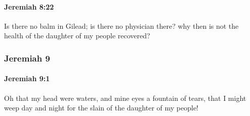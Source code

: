 		\paragraph{Jeremiah 8:22} %
			\label{JEREMIAH-8-22}

			Is there no balm in Gilead; is there no physician there? why then is not the health of the daughter of my people recovered?

	\subsubsection{Jeremiah 9} %
		\label{JEREMIAH-9}

		\paragraph{Jeremiah 9:1} %
			\label{JEREMIAH-9-1}

			Oh that my head were waters, and mine eyes a fountain of tears, that I might weep day and night for the slain of the daughter of my people!

